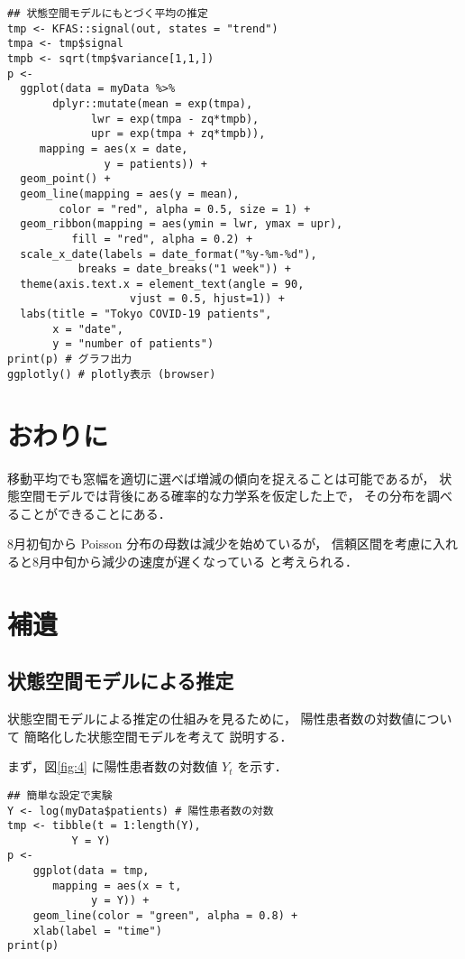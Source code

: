 \documentclass[10pt,oneside,fleqn]{scrartcl}
\begin{document}
\begin{verbatim}
## 状態空間モデルにもとづく平均の推定
tmp <- KFAS::signal(out, states = "trend")
tmpa <- tmp$signal
tmpb <- sqrt(tmp$variance[1,1,])
p <-
  ggplot(data = myData %>%
	   dplyr::mutate(mean = exp(tmpa),
			 lwr = exp(tmpa - zq*tmpb),
			 upr = exp(tmpa + zq*tmpb)),
	 mapping = aes(x = date,
		       y = patients)) +
  geom_point() +
  geom_line(mapping = aes(y = mean),
	    color = "red", alpha = 0.5, size = 1) +
  geom_ribbon(mapping = aes(ymin = lwr, ymax = upr),
	      fill = "red", alpha = 0.2) +
  scale_x_date(labels = date_format("%y-%m-%d"), 
	       breaks = date_breaks("1 week")) + 
  theme(axis.text.x = element_text(angle = 90, 
				   vjust = 0.5, hjust=1)) +
  labs(title = "Tokyo COVID-19 patients",
       x = "date",
       y = "number of patients")
print(p) # グラフ出力
ggplotly() # plotly表示 (browser)
\end{verbatim}

\section{おわりに}
\label{sec:org15ef121}

移動平均でも窓幅を適切に選べば増減の傾向を捉えることは可能であるが，
状態空間モデルでは背後にある確率的な力学系を仮定した上で，
その分布を調べることができることにある．

8月初旬から Poisson 分布の母数は減少を始めているが，
信頼区間を考慮に入れると8月中旬から減少の速度が遅くなっている
と考えられる．

\section{補遺}
\label{sec:org39f2f08}
\subsection{状態空間モデルによる推定}
\label{sec:org32b4223}

状態空間モデルによる推定の仕組みを見るために，
陽性患者数の対数値について
簡略化した状態空間モデルを考えて
説明する．

まず，図\ref{fig:4} に陽性患者数の対数値 \(Y_{t}\) を示す．
\begin{figure}[htbp]
  \centering
  \myGraph*{}
\end{figure}

\begin{verbatim}
## 簡単な設定で実験
Y <- log(myData$patients) # 陽性患者数の対数
tmp <- tibble(t = 1:length(Y),
	      Y = Y)
p <- 
    ggplot(data = tmp, 
	   mapping = aes(x = t,
			 y = Y)) +
    geom_line(color = "green", alpha = 0.8) +
    xlab(label = "time")
print(p)
\end{verbatim}
\end{document}
